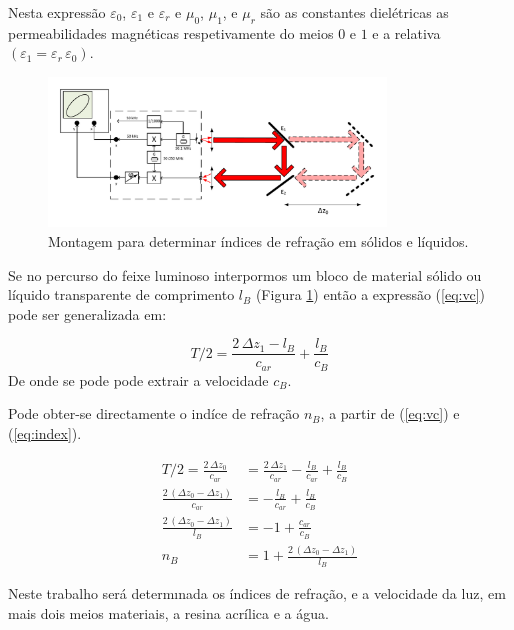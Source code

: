 \documentclass[a4paper,12pt]{article}      %
\begin{document}
Nesta expressão $\varepsilon_0$, $\varepsilon_1$ e $\varepsilon_r$   e  $\mu_0$, $\mu_1$, e $\mu_r$ são as constantes dielétricas  as permeabilidades magnéticas respetivamente do meios $0$ e $1$ e a relativa $(\varepsilon_1= \varepsilon_r\, \varepsilon_0)$.

\begin{figure}[h!tb]  
	\centering 
	\includegraphics[width=0.8\textwidth]{Vel_esquema_bloco}
	\caption{Montagem para determinar índices de refração em sólidos e líquidos. \label{fig:Montagem_bloco}} 
\end{figure}

Se no percurso do feixe luminoso interpormos um bloco de material sólido ou líquido transparente 
 de comprimento $l_B$ (Figura \ref{fig:Montagem_bloco}) então a expressão  (\ref{eq:vc}) pode ser generalizada em:

\begin{equation}
	\label{eq:vc_bloco}
	{T/2}  = \frac{2\,\Delta z_1 - l_B}{c_{ar}}  +  \frac{l_B}{c_{B}}
\end{equation}
De onde se pode pode extrair a velocidade $c_{B}$. 

Pode obter-se directamente o indíce de refração $n_{B}$, a partir de (\ref{eq:vc}) e (\ref{eq:index}).

\begin{align}
	\label{eq:n_bloco}
	{T/2}  = \frac{2\,\Delta z_0}{c_{ar}}  &=  \frac{2\,\Delta z_1 }{c_{ar}} -   \frac{l_B}{c_{ar}}  +  \frac{l_B}{c_{B}} \nonumber \\ 
	\frac{2\,(\Delta z_0- \Delta z_1 )}{c_{ar}}  &= -   \frac{l_B}{c_{ar}}  +  \frac{l_B}{c_{B}} \nonumber \\
	\frac{2\,(\Delta z_0- \Delta z_1 )}{l_B} &= -1 +  \frac{c_{ar}}{c_{B}} \nonumber \\
	n_{B} &= 1 +  \frac{2\,(\Delta z_0- \Delta z_1 )}{l_B} 
\end{align}

 Neste trabalho será  determınada os índices de refração, e a velocidade da
luz, em  mais dois meios materiais, a resina acrílica e a água. 
 
\end{document}
